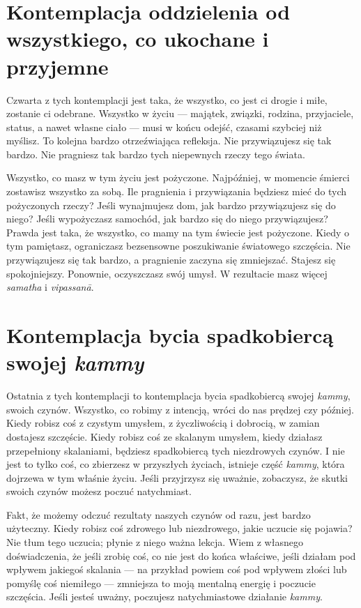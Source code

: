 \documentclass[12pt,openany]{book}
\begin{document}
\section*{Kontemplacja oddzielenia od wszystkiego, co ukochane i przyjemne}

Czwarta z tych kontemplacji jest taka, że wszystko, co jest ci drogie i miłe, zostanie ci odebrane. Wszystko w życiu --- majątek, związki, rodzina, przyjaciele, status, a nawet własne ciało --- musi w końcu odejść, czasami szybciej niż myślisz. To kolejna bardzo otrzeźwiająca refleksja. Nie przywiązujesz się tak bardzo. Nie \linebreak pragniesz tak bardzo tych niepewnych rzeczy tego świata.

Wszystko, co masz w tym życiu jest pożyczone. Najpóźniej, w momencie śmierci zostawisz wszystko za sobą. Ile pragnienia i przywiązania będziesz mieć do tych pożyczonych rzeczy? Jeśli wynajmujesz dom, jak bardzo przywiązujesz się do niego? Jeśli wypożyczasz samochód, jak bardzo się do niego przywiązujesz? Prawda jest taka, że wszystko, co mamy na tym świecie jest pożyczone. Kiedy o tym pamiętasz, ograniczasz bezsensowne poszukiwanie światowego szczęścia. Nie przywiązujesz się tak bardzo, a pragnienie zaczyna się zmniejszać. Stajesz się spokojniejszy. Ponownie, oczyszczasz swój umysł. W rezultacie masz więcej \textit{samatha} i \textit{vipassanā}.

\section*{Kontemplacja bycia spadkobiercą swojej \textit{kammy}}

Ostatnia z tych kontemplacji to kontemplacja bycia spadkobiercą swojej \textit{kammy}, swoich czynów. Wszystko, co robimy z intencją, wróci do nas prędzej czy później. Kiedy robisz coś z czystym umysłem, z życzliwością i dobrocią, w zamian dostajesz szczęście. \linebreak Kiedy robisz coś ze skalanym umysłem, kiedy działasz przepełniony skalaniami, będziesz spadkobiercą tych niezdrowych czynów. I nie jest to tylko coś, co zbierzesz w przyszłych życiach, istnieje część \textit{kammy}, która dojrzewa w tym właśnie życiu. Jeśli przyjrzysz się uważnie, zobaczysz, że skutki swoich czynów możesz poczuć natychmiast.

Fakt, że możemy odczuć rezultaty naszych czynów od razu, jest bardzo użyteczny. Kiedy robisz coś zdrowego lub nie\-zdro\-we\-go, jakie uczucie się pojawia? Nie tłum tego uczucia; płynie z niego ważna lekcja. Wiem z własnego doświadczenia, że jeśli zrobię coś, co nie jest do końca właściwe, jeśli działam pod wpływem jakiegoś skalania --- na przykład powiem coś pod wpływem złości lub pomyślę coś niemiłego --- zmniejsza to moją mentalną energię i poczucie szczęścia. Jeśli jesteś uważny, poczujesz natychmiastowe działanie \textit{kammy}.
\end{document}
